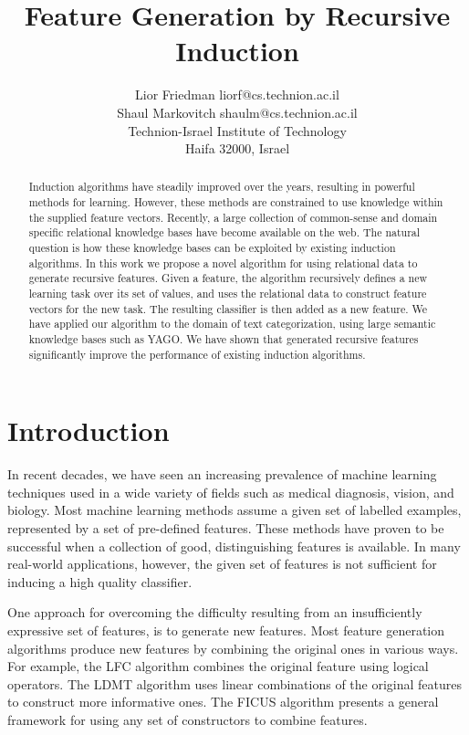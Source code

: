 \documentclass[twoside,11pt]{article}
\title{Feature Generation by Recursive Induction}
\author{\name Lior Friedman \email liorf@cs.technion.ac.il \\
	\name Shaul Markovitch \email shaulm@cs.technion.ac.il \\
	\addr Technion-Israel Institute of Technology\\
	Haifa 32000, Israel
	}
\theoremstyle{definition}
\begin{document}
\maketitle

\begin{abstract}
  Induction algorithms have steadily improved over the years, resulting in powerful methods for learning. However, these methods are constrained to use knowledge within the supplied feature vectors. Recently, a large collection of common-sense and domain specific relational knowledge bases have become available on the web. The natural question is how these knowledge bases can be exploited by existing induction algorithms.
  In this work we propose a novel algorithm for using relational data to generate recursive features. Given a feature, the algorithm recursively defines a new learning task over its set of values, and uses the relational data to construct feature vectors for the new task. The resulting classifier is then added as a new feature.
  We have applied our algorithm to the domain of text categorization, using large semantic knowledge bases such as YAGO. We have shown that generated recursive features significantly improve the performance of existing induction algorithms.
\end{abstract}

\section{Introduction}
\label{sec:Intro}
In recent decades, we have seen an increasing prevalence of machine learning techniques used in a wide variety of fields such as medical diagnosis, vision, and biology.
Most machine learning methods assume a given set of labelled examples, represented by a set of
pre-defined features. These methods have proven to be successful when a collection of good,
distinguishing features is available.
In many real-world applications, however, the given set of features is not sufficient for inducing a high quality classifier.

One approach for overcoming the difficulty resulting from an insufficiently expressive set of features, is to generate new features.  Most feature generation algorithms produce new features by combining the original ones in various ways.  For example, the LFC algorithm \cite{ragavan1993complex} combines the original feature using logical operators.  The LDMT algorithm \cite{utgo1991linear} uses linear combinations of the original features to construct more informative ones.  The FICUS algorithm \cite{markovitch2002feature} presents a general framework for using any set of constructors to combine features.
\end{document}
